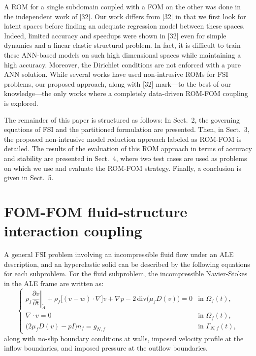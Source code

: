 \documentclass[11pt]{article}
\begin{document}
A ROM for a single subdomain coupled with a FOM on the other was done in the independent work of [32]. Our work differs from [32] in that we first look for latent spaces before finding an adequate regression model between these spaces. Indeed, limited accuracy and speedups were shown in [32] even for simple dynamics and a linear elastic structural problem. In fact, it is difficult to train these ANN-based models on such high dimensional spaces while maintaining a high accuracy. Moreover, the Dirichlet conditions are not enforced with a pure ANN solution. While several works have used non-intrusive ROMs for FSI problems, our proposed approach, along with [32] mark---to the best of our knowledge---the only works where a completely data-driven ROM-FOM coupling is explored.

The remainder of this paper is structured as follows: In Sect.\ 2, the governing equations of FSI and the partitioned formulation are presented. Then, in Sect.\ 3, the proposed non-intrusive model reduction approach labeled as ROM-FOM is detailed. The results of the evaluation of this ROM approach in terms of accuracy and stability are presented in Sect.\ 4, where two test cases are used as problems on which we use and evaluate the ROM-FOM strategy. Finally, a conclusion is given in Sect.\ 5.

\section{FOM-FOM fluid-structure interaction coupling}

A general FSI problem involving an incompressible fluid flow under an ALE description, and an hyperelastic solid can be described by the following equations for each subproblem. For the fluid subproblem, the incompressible Navier-Stokes in the ALE frame are written as:
\begin{equation}
\tag{1}
\begin{cases}
\rho_f \left.\dfrac{\partial v}{\partial t}\right|_{\tilde{A}} + \rho_f \big[(v-w)\cdot\nabla\big]v + \nabla p - 2\,\mathrm{div}\!\big(\mu_f D(v)\big) = 0 & \text{in } \Omega_f(t),\\[0.5em]
\nabla \cdot v = 0 & \text{in } \Omega_f(t),\\[0.5em]
\big(2\mu_f D(v) - pI\big)n_f = g_{N,f} & \text{in } \Gamma_{N,f}(t),
\end{cases}
\end{equation}
along with no-slip boundary conditions at walls, imposed velocity profile at the inflow boundaries, and imposed pressure at the outflow boundaries.
\end{document}
